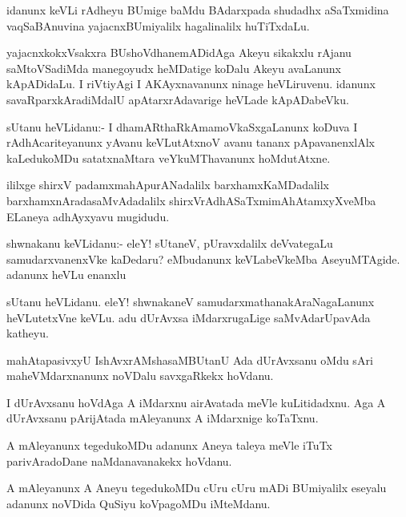 \begin{mng}
idanunx keVLi rAdheyu BUmige baMdu BAdarxpada shudadhx aSaTxmidina vaqSaBAnuvina yajacnxBUmiyalilx hagalinalilx huTiTxdaLu.
\end{mng}

\begin{mng}
yajacnxkokxVsakxra BUshoVdhanemADidAga Akeyu sikakxlu rAjanu saMtoVSadiMda manegoyudx heMDatige koDalu Akeyu avaLanunx kApADidaLu. I riVtiyAgi I AKAyxnavanunx ninage heVLiruvenu. idanunx savaRparxkAradiMdalU apAtarxrAdavarige heVLade kApADabeVku.
\end{mng}

\begin{mng}
sUtanu heVLidanu:- I dhamARthaRkAmamoVkaSxgaLanunx koDuva I rAdhAcariteyanunx yAvanu keVLutAtxnoV avanu tananx pApavanenxlAlx  kaLedukoMDu satatxnaMtara veYkuMThavanunx hoMdutAtxne.
\end{mng}
ililxge shirxV padamxmahApurANadalilx barxhamxKaMDadalilx barxhamxnAradasaMvAdadalilx  shirxVrAdhASaTxmimAhAtamxyXveMba ELaneya adhAyxyavu mugidudu.

\begin{mng}
shwnakanu keVLidanu:- eleY! sUtaneV, pUravxdalilx deVvategaLu samudarxvanenxVke kaDedaru? eMbudanunx keVLabeVkeMba AseyuMTAgide. adanunx heVLu enanxlu
\end{mng}

\begin{mng}
sUtanu heVLidanu. eleY! shwnakaneV samudarxmathanakAraNagaLanunx heVLutetxVne keVLu. adu dUrAvxsa iMdarxrugaLige saMvAdarUpavAda katheyu.
\end{mng}

\begin{mng}
mahAtapasivxyU IshAvxrAMshasaMBUtanU Ada dUrAvxsanu oMdu sAri maheVMdarxnanunx noVDalu savxgaRkekx hoVdanu.
\end{mng}

\begin{mng}
I dUrAvxsanu hoVdAga A iMdarxnu airAvatada meVle kuLitidadxnu. Aga A dUrAvxsanu pArijAtada mAleyanunx A iMdarxnige koTaTxnu.
\end{mng}

\begin{mng}
A mAleyanunx tegedukoMDu adanunx Aneya taleya meVle iTuTx parivAradoDane naMdanavanakekx hoVdanu.
\end{mng}

\begin{mng}
A mAleyanunx A Aneyu tegedukoMDu cUru cUru mADi BUmiyalilx eseyalu adanunx noVDida QuSiyu koVpagoMDu iMteMdanu.
\end{mng}

